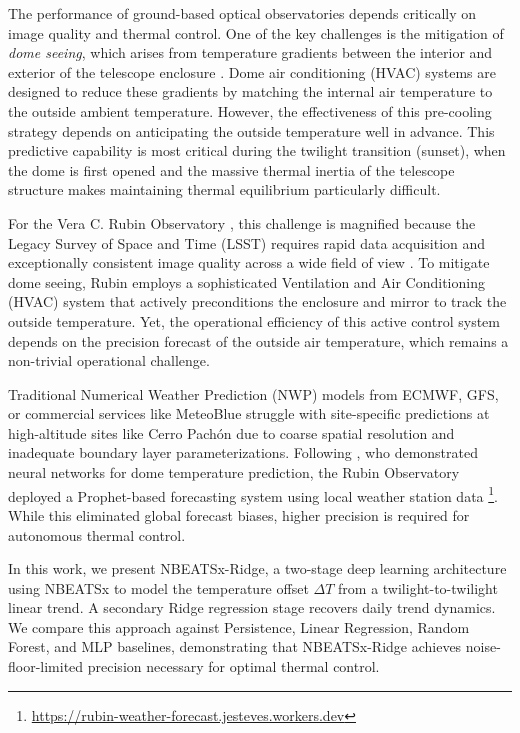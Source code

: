 \documentclass[twocolumn]{aastex631}
\begin{document}
The performance of ground-based optical observatories depends critically on image quality and thermal control. One of the key challenges is the mitigation of \emph{dome seeing}, which arises from temperature gradients between the interior and exterior of the telescope enclosure \citep{Racine1991, Emelianov2015}. Dome air conditioning (HVAC) systems are designed to reduce these gradients by matching the internal air temperature to the outside ambient temperature. However, the effectiveness of this pre-cooling strategy depends on anticipating the outside temperature well in advance. This predictive capability is most critical during the twilight transition (sunset), when the dome is first opened and the massive thermal inertia of the telescope structure makes maintaining thermal equilibrium particularly difficult.

For the Vera C. Rubin Observatory \citep{ivezic19}, this challenge is magnified because the Legacy Survey of Space and Time (LSST) requires rapid data acquisition and exceptionally consistent image quality across a wide field of view \citep{Esteves2023}. To mitigate dome seeing, Rubin employs a sophisticated Ventilation and Air Conditioning (HVAC) system that actively preconditions the enclosure and mirror to track the outside temperature. Yet, the operational efficiency of this active control system depends on the precision forecast of the outside air temperature, which remains a non-trivial operational challenge.


Traditional Numerical Weather Prediction (NWP) models from ECMWF, GFS, or commercial services like MeteoBlue struggle with site-specific predictions at high-altitude sites like Cerro Pach\'on due to coarse spatial resolution and inadequate boundary layer parameterizations. Following \citet{Buffa1997}, who demonstrated neural networks for dome temperature prediction, the Rubin Observatory deployed a Prophet-based \citep{Taylor2017} forecasting system using local weather station data \footnote{\url{https://rubin-weather-forecast.jesteves.workers.dev}}. While this eliminated global forecast biases, higher precision is required for autonomous thermal control.

In this work, we present NBEATSx-Ridge, a two-stage deep learning architecture using NBEATSx \citep{Olivares2021} to model the temperature offset $\Delta T$ from a twilight-to-twilight linear trend. A secondary Ridge regression stage recovers daily trend dynamics. We compare this approach against Persistence, Linear Regression, Random Forest, and MLP baselines, demonstrating that NBEATSx-Ridge achieves noise-floor-limited precision necessary for optimal thermal control.
\end{document}
